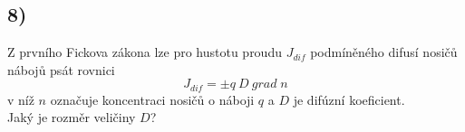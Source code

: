 \newpage


\subsection*{8)}

Z prvního Fickova zákona lze pro hustotu proudu $J_{dif}$ podmíněného difusí nosičů nábojů psát rovnici
\begin{equation}
    J_{dif}=\pm q \ D \ grad \; n
\end{equation}
v níž $n$ označuje koncentraci nosičů o náboji $q$ a $D$ je difúzní koeficient. \\
Jaký je rozměr veličiny $D$?



